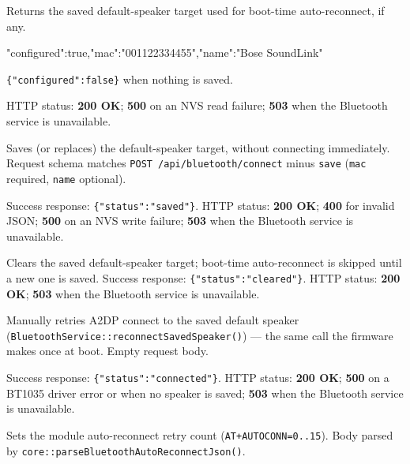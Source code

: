 \label{sec:api-bluetooth-speaker-get}

Returns the saved default-speaker target used for boot-time auto-reconnect,
if any.

\begin{drnote}
\begin{drcode}[JSON]
{"configured":true,"mac":"001122334455","name":"Bose SoundLink"}
\end{drcode}
\texttt{\{"configured":false\}} when nothing is saved.
\end{drnote}

HTTP status: \textbf{200 OK}; \textbf{500} on an NVS read failure;
\textbf{503} when the Bluetooth service is unavailable.

\label{sec:api-bluetooth-speaker-post}

Saves (or replaces) the default-speaker target, without connecting
immediately. Request schema matches
\texttt{POST /api/bluetooth/connect} minus \texttt{save} (\texttt{mac}
required, \texttt{name} optional).

Success response: \texttt{\{"status":"saved"\}}. HTTP status:
\textbf{200 OK}; \textbf{400} for invalid JSON; \textbf{500} on an NVS
write failure; \textbf{503} when the Bluetooth service is unavailable.

\label{sec:api-bluetooth-speaker-delete}

Clears the saved default-speaker target; boot-time auto-reconnect is
skipped until a new one is saved. Success response:
\texttt{\{"status":"cleared"\}}. HTTP status: \textbf{200 OK};
\textbf{503} when the Bluetooth service is unavailable.

\label{sec:api-bluetooth-reconnect}

Manually retries A2DP connect to the saved default speaker
(\texttt{BluetoothService::reconnectSavedSpeaker()}) --- the same call the
firmware makes once at boot. Empty request body.

Success response: \texttt{\{"status":"connected"\}}. HTTP status:
\textbf{200 OK}; \textbf{500} on a BT1035 driver error or when no speaker
is saved; \textbf{503} when the Bluetooth service is unavailable.

\label{sec:api-bluetooth-auto-reconnect}

Sets the module auto-reconnect retry count (\texttt{AT+AUTOCONN=0..15}).
Body parsed by \texttt{core::parseBluetoothAutoReconnectJson()}.

